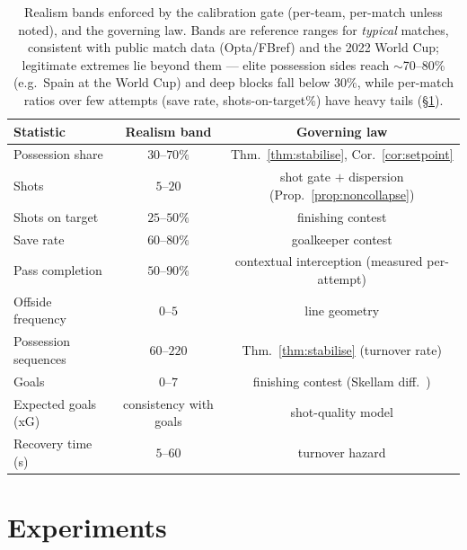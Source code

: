 \documentclass[11pt]{article}
\theoremstyle{definition}
\theoremstyle{remark}
\begin{document}
\begin{table}[h]\centering
\caption{Realism bands enforced by the calibration gate (per-team, per-match unless noted), and the governing law. Bands are reference ranges for \emph{typical} matches, consistent with public match data (Opta/FBref) and the 2022 World Cup; legitimate extremes lie beyond them --- elite possession sides reach $\sim$70--80\% (e.g.\ Spain at the World Cup) and deep blocks fall below $30\%$, while per-match ratios over few attempts (save rate, shots-on-target\%) have heavy tails (\S\ref{sec:exp}).}
\label{tab:bands}
\small
\begin{tabular}{lcc}
\toprule
Statistic & Realism band & Governing law \\
\midrule
Possession share & $30$--$70\%$ & Thm.~\ref{thm:stabilise}, Cor.~\ref{cor:setpoint} \\
Shots & $5$--$20$ & shot gate $+$ dispersion (Prop.~\ref{prop:noncollapse}) \\
Shots on target & $25$--$50\%$ & finishing contest \\
Save rate & $60$--$80\%$ & goalkeeper contest \\
Pass completion & $50$--$90\%$ & contextual interception (measured per-attempt) \\
Offside frequency & $0$--$5$ & line geometry \\
Possession sequences & $60$--$220$ & Thm.~\ref{thm:stabilise} (turnover rate) \\
Goals & $0$--$7$ & finishing contest (Skellam diff.\ \citep{skellam1946}) \\
Expected goals (xG) & consistency with goals & shot-quality model \\
Recovery time (s) & $5$--$60$ & turnover hazard \\
\bottomrule
\end{tabular}
\end{table}

\section{Experiments}\label{sec:exp}
\end{document}
